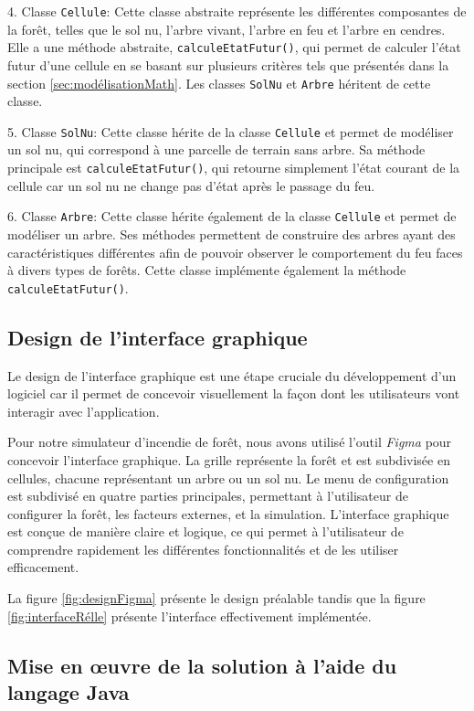 4. Classe \texttt{Cellule}: Cette classe abstraite représente les différentes composantes de la forêt, telles que le sol nu, l'arbre vivant, l'arbre en feu et l'arbre en cendres. Elle a une méthode abstraite, \texttt{calculeEtatFutur()}, qui permet de calculer l'état futur d'une cellule en se basant sur plusieurs critères tels que présentés dans la section \ref{sec:modélisationMath}. Les classes \texttt{SolNu} et \texttt{Arbre} héritent de cette classe.

5. Classe \texttt{SolNu}: Cette classe hérite de la classe \texttt{Cellule} et permet de modéliser un sol nu, qui correspond à une parcelle de terrain sans arbre. Sa méthode principale est \texttt{calculeEtatFutur()}, qui retourne simplement l'état courant de la cellule car un sol nu ne change pas d'état après le passage du feu.

6. Classe \texttt{Arbre}: Cette classe hérite également de la classe \texttt{Cellule} et permet de modéliser un arbre. Ses méthodes permettent de construire des arbres ayant des caractéristiques différentes afin de pouvoir observer le comportement du feu faces à divers types de forêts. Cette classe implémente également la méthode \texttt{calculeEtatFutur()}.

\subsection{Design de l’interface graphique}

Le design de l'interface graphique est une étape cruciale du développement d'un logiciel car il permet de concevoir visuellement la façon dont les utilisateurs vont interagir avec l'application. 

Pour notre simulateur d'incendie de forêt, nous avons utilisé l'outil \textit{Figma} pour concevoir l'interface graphique. La grille représente la forêt et est subdivisée en cellules, chacune représentant un arbre ou un sol nu. Le menu de configuration est subdivisé en quatre parties principales, permettant à l'utilisateur de configurer la forêt, les facteurs externes, et la simulation. L'interface graphique est conçue de manière claire et logique, ce qui permet à l'utilisateur de comprendre rapidement les différentes fonctionnalités et de les utiliser efficacement. 

La figure \ref{fig:designFigma} présente le design préalable tandis que la figure \ref{fig:interfaceRélle} présente l'interface effectivement implémentée.

\subsection{Mise en œuvre de la solution à l’aide du langage Java}

